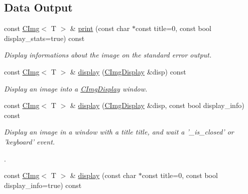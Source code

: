 \subsection*{Data Output}
\label{_amgrp94c0e9b311d45b04fc37b41903c6debc}
 \begin{DoxyCompactItemize}
\item 
const \hyperlink{structcimg__library_1_1CImg}{CImg}$<$ T $>$ \& \hyperlink{structcimg__library_1_1CImg_a08c9af60939dd09cc811c508017c32f3}{print} (const char $\ast$const title=0, const bool display\_\-stats=true) const 
\begin{DoxyCompactList}\small\item\em Display informations about the image on the standard error output. \item\end{DoxyCompactList}\item 
\hypertarget{structcimg__library_1_1CImg_aea0592215c6068e617a975a1fe5b7b7b}{
const \hyperlink{structcimg__library_1_1CImg}{CImg}$<$ T $>$ \& \hyperlink{structcimg__library_1_1CImg_aea0592215c6068e617a975a1fe5b7b7b}{display} (\hyperlink{structcimg__library_1_1CImgDisplay}{CImgDisplay} \&disp) const }
\label{structcimg__library_1_1CImg_aea0592215c6068e617a975a1fe5b7b7b}

\begin{DoxyCompactList}\small\item\em Display an image into a \hyperlink{structcimg__library_1_1CImgDisplay}{CImgDisplay} window. \item\end{DoxyCompactList}\item 
\hypertarget{structcimg__library_1_1CImg_a7875588dbc9fb83602611b6ae03c73fa}{
const \hyperlink{structcimg__library_1_1CImg}{CImg}$<$ T $>$ \& \hyperlink{structcimg__library_1_1CImg_a7875588dbc9fb83602611b6ae03c73fa}{display} (\hyperlink{structcimg__library_1_1CImgDisplay}{CImgDisplay} \&disp, const bool display\_\-info) const }
\label{structcimg__library_1_1CImg_a7875588dbc9fb83602611b6ae03c73fa}

\begin{DoxyCompactList}\small\item\em Display an image in a window with a title {\ttfamily title}, and wait a '\_\-is\_\-closed' or 'keyboard' event.\par
. \item\end{DoxyCompactList}\item 
\hypertarget{structcimg__library_1_1CImg_a32ca7381aa7cc3e3b8620024767e8525}{
const \hyperlink{structcimg__library_1_1CImg}{CImg}$<$ T $>$ \& \hyperlink{structcimg__library_1_1CImg_a32ca7381aa7cc3e3b8620024767e8525}{display} (const char $\ast$const title=0, const bool display\_\-info=true) const }
\label{structcimg__library_1_1CImg_a32ca7381aa7cc3e3b8620024767e8525}


\end{DoxyCompactItemize}
